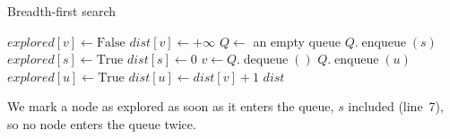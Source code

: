 \documentclass[a4paper,12pt,oneside]{report}
\begin{document}
\begin{framedalgo}{Breadth-first search}\label{alg:bfs}
\begin{algorithmic}[1]
      \State $\mathit{explored}[v]\gets\mathrm{False}$
      \State $\mathit{dist}[v]\gets+\infty$
    \EndFor
    \State $Q\gets$ an empty queue
    \State $Q.\operatorname{enqueue}(s)$
    \State $\mathit{explored}[s]\gets\mathrm{True}$
    \State $\mathit{dist}[s]\gets0$
      \State $v\gets Q.\operatorname{dequeue}()$
          \State $Q.\operatorname{enqueue}(u)$
          \State $\mathit{explored}[u]\gets\mathrm{True}$
          \State $\mathit{dist}[u]\gets\mathit{dist}[v]+1$
        \EndIf
      \EndFor
    \EndWhile
    \State \Return $\mathit{dist}$
  \EndFunction
\end{algorithmic}
\end{framedalgo}

We mark a node as explored as soon as it enters the queue, $s$
included (line~7), so no node enters the queue twice.

\newcommand{\trgraph}[3]{%
  \begin{tikzpicture}[x=0.8cm,y=0.8cm,
    u/.style={gnode},
    w/.style={gnode,fill=yellow!45},
    c/.style={gnode,fill=PlotRed!20,draw=PlotRed,very thick},
    d/.style={gnode,fill=PlotBlue!30}]
    \foreach \st [count=\i] in {#1} {
      \ifcase\i\or\def\xy{(0,0.8)}\or\def\xy{(1.5,0.8)}\or
        \def\xy{(1.5,-0.6)}\or\def\xy{(0,-0.6)}\or\def\xy{(3,0.1)}\fi
      \node[\st] (n\i) at \xy {$\i$};}
    \draw (n1)--(n2) (n1)--(n4) (n2)--(n3) (n2)--(n4) (n2)--(n5);
    \if\relax\detokenize{#2}\relax\else
      \foreach \x/\y in {#2} \draw[PlotRed,very thick] (n\x)--(n\y);\fi
    \if\relax\detokenize{#3}\relax\else
      \foreach \x/\l in {#3}
        \node[font=\scriptsize,text=PlotBlue,above left=-3pt] at (n\x.north west) {\l};\fi
  \end{tikzpicture}}
\newcommand{\trbox}[2]{%
  \begin{tikzpicture}[x=0.5cm,y=0.5cm,baseline=(b.base)]
    \node[anchor=east,font=\small] (b) at (-0.1,0) {#1};
    \if\relax\detokenize{#2}\relax
      \node[anchor=west,font=\small] at (0,0) {empty};
    \else
      \foreach \v [count=\j from 0] in {#2} {
        \draw[fill=yellow!45] (\j,-0.5) rectangle (\j+1,0.5);
        \node at (\j+0.5,0) {$\v$};}
    \fi
  \end{tikzpicture}}
\newcommand{\trstep}[6]{%
  \par\noindent
  \begin{minipage}[c]{0.4\textwidth}\centering
    \trgraph{#1}{#2}{#3}\\[2pt]\trbox{#4}{#5}
  \end{minipage}\hfill
  \begin{minipage}[c]{0.56\textwidth}\small #6\end{minipage}
  \par\medskip}
\end{document}
